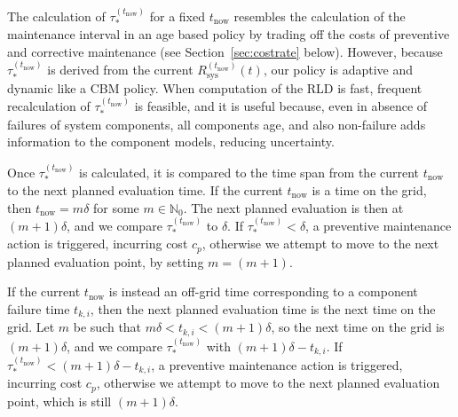 \documentclass[authoryear]{elsarticle}
\newcommand{\naturals}{\mathbb{N}}
\def\yknow{y_k^{(\tnow)}}
\def\nknow{n_k^{(\tnow)}}
\def\tnow{t_\text{now}}
\def\tpnow{t^+_\text{now}}
\newcommand{\Rsysnow}{R^{(t_\text{now})}_\text{sys}}
\newcommand{\gnow}{g^{(\tnow)}}
\newcommand{\tausnow}{\tau_*^{(\tnow)}}
\begin{document}
The calculation of $\tausnow$ for a fixed $\tnow$ resembles the calculation
of the maintenance interval in an age based policy by trading off the costs of preventive and corrective maintenance
(see Section~\ref{sec:costrate} below).
However, because $\tausnow$ is derived from the current $\Rsysnow(t)$,
our policy is adaptive and dynamic like a CBM policy. 
When computation of the RLD is fast,
frequent recalculation of $\tausnow$ is feasible,
and it is useful because,
even in absence of failures of system components,
all components age, and also non-failure adds information to the component models,
reducing uncertainty.
%

Once $\tausnow$ is calculated, it is compared to the time span from the current $\tnow$ to the next planned evaluation time.
If the current $\tnow$ is a time on the grid, then $\tnow = m \delta$ for some $m \in \naturals_0$.
The next planned evaluation is then at $(m + 1) \delta$,
and we compare $\tausnow$ to $\delta$.
If $\tausnow < \delta$, a preventive maintenance action is triggered, incurring cost $c_p$,
otherwise we attempt to move to the next planned evaluation point, by setting $m =  (m + 1)$.

If the current $\tnow$ is instead an off-grid time corresponding to a component failure time $t_{k,i}$,
then the next planned evaluation time is the next time on the grid.
Let $m$ be such that $m \delta < t_{k,i} < (m + 1) \delta$,
so the next time on the grid is $(m + 1) \delta$,
and we compare $\tausnow$ with $(m + 1) \delta - t_{k,i}$.
If $\tausnow < (m + 1) \delta - t_{k,i}$, a preventive maintenance action is triggered, incurring cost $c_p$,
otherwise we attempt to move to the next planned evaluation point, which is still $(m + 1) \delta$.
\end{document}
